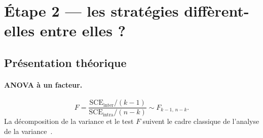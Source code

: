 

\section{Étape 2 --- les stratégies diffèrent-elles entre elles ?}
\label{sec:b1-etape2}

\subsection{Présentation théorique}
\paragraph{ANOVA à un facteur.}
\[
  F = \frac{\mathrm{SCE}_{\text{inter}}/(k-1)}
           {\mathrm{SCE}_{\text{intra}}/(n-k)} \sim F_{k-1,\,n-k}.
\]
La décomposition de la variance et le test \(F\) suivent le cadre
classique de l'analyse de la variance~\cite{scheffe1959}.

